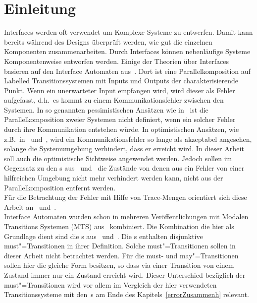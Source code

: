 \chapter{Einleitung}

Interfaces werden oft verwendet um Komplexe Systeme zu entwerfen. Damit kann
bereits während des Designs überprüft werden, wie gut die einzelnen Komponenten
zusammenarbeiten. Durch Interfaces können nebenläufige Systeme Komponentenweise
entworfen werden. Einige der Theorien über Interfaces basieren auf den
Interface Automaten aus~\cite{Alfaro2004}. Dort ist eine
Parallelkomposition auf Labelled Transitionssystemen mit Inputs und Outputs der
charakterisierende Punkt. Wenn ein unerwarteter Input empfangen wird, wird
dieser als Fehler aufgefasst, d.h.\ es kommt zu einem Kommunikationsfehler
zwischen den Systemen. In so genannten pessimistischen Ansätzen wie
in~\cite{Bauer2010} ist die Parallelkomposition zweier Systemen nicht
definiert, wenn ein solcher Fehler durch ihre Kommunikation entstehen würde. In
optimistischen Ansätzen, wie z.B.\ in~\cite{Luttgen2013MIA1}
und~\cite{Vogler2016MIA3}, wird ein Kommunikationsfehler so lange als
akzeptabel angesehen, solange die Systemumgebung verhindert, dass er erreicht
wird. In dieser Arbeit soll auch die optimistische Sichtweise angewendet
werden. Jedoch sollen im Gegensatz zu den \MIA{}s aus~\cite{Luttgen2013MIA1}
und~\cite{Vogler2016MIA3} die Zustände von denen aus ein Fehler von einer
hilfreichen Umgebung nicht mehr verhindert werden kann, nicht aus der
Parallelkomposition entfernt werden.\\
Für die Betrachtung der Fehler mit Hilfe von Trace-Mengen orientiert sich diese
Arbeit an~\cite{Vogler2014EIO} und~\cite{Schinko2016BA}.\\
Interface Automaten wurden schon in mehreren Veröffentlichungen mit Modalen
Transitions Systemen (MTS) aus~\cite{Larsen1989} kombiniert. Die Kombination
die hier als Grundlage dient sind die \MIA{}s aus~\cite{Luttgen2013MIA1}
und~\cite{Vogler2016MIA3}. Die \MIA{}s enthalten disjunktive must"=Transitionen
in ihrer Definition. Solche must"=Transitionen sollen in dieser Arbeit nicht
betrachtet werden. Für die must- und may"=Transitionen sollen hier die gleiche
Form besitzen, so dass via einer Transition von einem Zustand immer nur ein
Zustand erreicht wird. Dieser Unterschied bezüglich der must"=Transitionen wird
vor allem im Vergleich der hier verwendeten Transitionssysteme mit den~\MIA{}s
am Ende des Kapitels~\ref{errorZusammenh} relevant.

